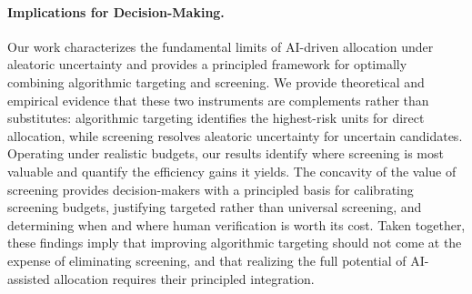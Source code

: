 \paragraph{Implications for Decision-Making.} 

Our work characterizes the fundamental limits of AI-driven allocation under aleatoric uncertainty and provides a principled framework for optimally combining algorithmic targeting and screening. 
We provide theoretical and empirical evidence that these two instruments are complements rather than substitutes: algorithmic targeting identifies the highest-risk units for direct allocation, while screening resolves aleatoric uncertainty for uncertain candidates. 
Operating under realistic budgets, our results identify where screening is most valuable and quantify the efficiency gains it yields. The concavity of the value of screening provides decision-makers with a principled basis for calibrating screening budgets, justifying targeted rather than universal screening, and determining when and where human verification is worth its cost. Taken together, these findings imply that improving algorithmic targeting should not come at the expense of eliminating screening, and that realizing the full potential of AI-assisted allocation requires their principled integration.
